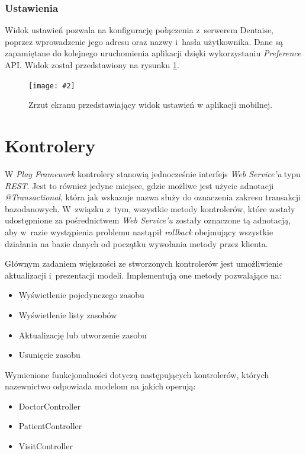 \documentclass[11pt]{aghdpl}
\newcommand{\customWidthPicture}[3]{
\begin{figure}[h!]
	\centering
		\texttt{[image: \#2]}
	\caption{#3}
	\label{fig:#2}
\end{figure}
}
\begin{document}
\subsubsection{Ustawienia}
\label{sec:ustawieniaMobile}

Widok ustawień pozwala na konfigurację połączenia z~serwerem Dentaise, poprzez wprowadzenie jego adresu oraz nazwy i~hasła użytkownika. Dane są zapamiętane do kolejnego uruchomienia aplikacji dzięki wykorzystaniu \emph{Preference} API. Widok został przedstawiony na rysunku \ref{fig:ustawieniaMobile}.

\customWidthPicture{.3}{ustawieniaMobile}{Zrzut ekranu przedstawiający widok ustawień w aplikacji mobilnej.}

\section{Kontrolery}

W \emph{Play Framework} kontrolery stanowią jednocześnie interfejs \emph{Web Service'u} typu \emph{REST}. Jest to również jedyne miejsce, gdzie możliwe jest użycie adnotacji \emph{@Transactional}, która jak wskazuje nazwa służy do oznaczenia zakresu transakcji bazodanowych. W~związku z~tym, wszystkie metody kontrolerów, które zostały udostępnione za pośrednictwem \emph{Web Service'u} zostały oznaczone tą adnotacją, aby w~razie wystąpienia problemu nastąpił \emph{rollback} obejmujący wszystkie działania na bazie danych od początku wywołania metody przez klienta.

Głównym zadaniem większości ze stworzonych kontrolerów jest umożliwienie aktualizacji i~prezentacji modeli. Implementują one metody pozwalające na:

\begin{itemize}
	\item Wyświetlenie pojedynczego zasobu
	\item Wyświetlenie listy zasobów
	\item Aktualizację lub utworzenie zasobu
	\item Usunięcie zasobu
\end{itemize}

Wymienione funkcjonalności dotyczą następujących kontrolerów, których nazewnictwo odpowiada modelom na jakich operują:

\begin{itemize}
	\item DoctorController
	\item PatientController
	\item VisitController
\end{itemize}
\end{document}
